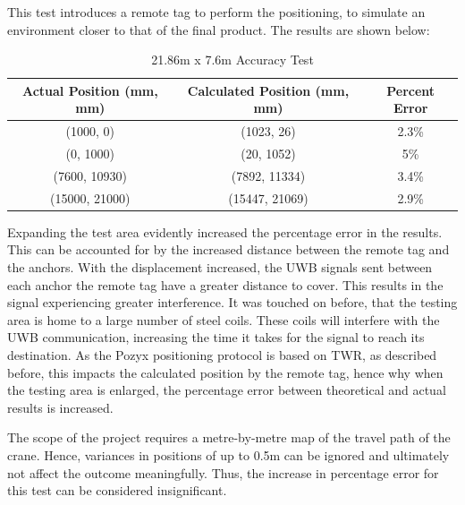 \documentclass[12pt, a4paper]{article}
\begin{document}
This test introduces a remote tag to perform the positioning, to simulate an environment closer to that of the final product. The results are
shown below:
\begin{center}
    \begin{table}[h]
        \begin{adjustbox}{width=1\textwidth, center=\textwidth}
            \small
            \begin{tabular}{||c c c||}
                \hline
                Actual Position (mm, mm) & Calculated Position (mm, mm) & Percent Error \\
                \hline
                (1000, 0) & (1023, 26) & 2.3\% \\
                \hline
                (0, 1000) & (20, 1052) & 5\% \\
                \hline
                (7600, 10930) & (7892, 11334) & 3.4\% \\
                \hline
                (15000, 21000) & (15447, 21069) & 2.9\% \\
                \hline
            \end{tabular}
        \end{adjustbox}
        \caption{21.86m x 7.6m Accuracy Test}
        \label{tab:res2}
    \end{table}
\end{center}
Expanding the test area evidently increased the percentage error in the results. This can be accounted for by the increased distance between 
the remote tag and the anchors. With the displacement increased, the UWB signals sent between each anchor the remote tag have a greater distance to cover.
This results in the signal experiencing greater interference. It was touched on before, that the testing area is home to a large number of steel coils. 
These coils will interfere with the UWB communication, increasing the time it takes for the signal to reach its destination. As the Pozyx positioning
protocol is based on TWR, as described before, this impacts the calculated position by the remote tag, hence why when the testing area is enlarged,
the percentage error between theoretical and actual results is increased.

The scope of the project requires a metre-by-metre map
of the travel path of the crane. Hence, variances in positions of up to 0.5m can be ignored and ultimately not affect the outcome
meaningfully. Thus, the increase in percentage error for this test can be considered insignificant.
\end{document}
